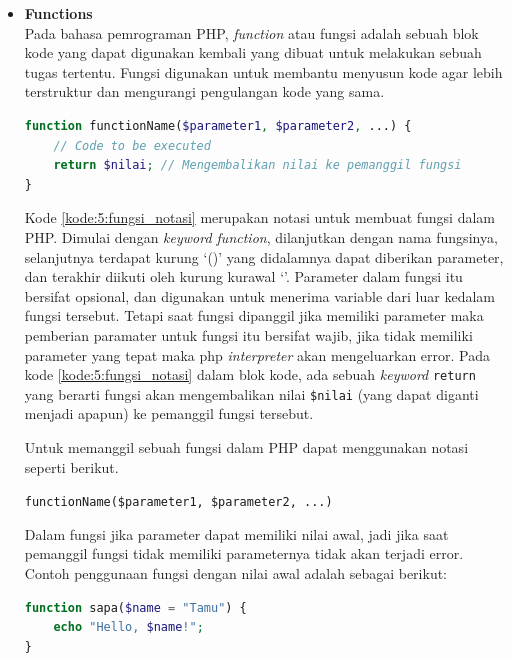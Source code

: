 \documentclass[a4paper,twoside]{article}
\begin{document}
\begin{enumerate}
\begin{itemize}
\begin{itemize}
		            \end{itemize}

		      \item \textbf{Functions} \\
		            Pada bahasa pemrograman PHP, \textit{function} atau fungsi adalah sebuah blok kode yang dapat digunakan kembali yang dibuat untuk melakukan sebuah tugas tertentu. Fungsi digunakan untuk membantu menyusun kode agar lebih terstruktur dan mengurangi pengulangan kode yang sama.

		            \begin{lstlisting}[language={php}, caption={Notasi fungsi}, label={kode:5:fungsi_notasi}]
function functionName($parameter1, $parameter2, ...) {
    // Code to be executed
	return $nilai; // Mengembalikan nilai ke pemanggil fungsi
}
			  \end{lstlisting}

		            Kode \ref{kode:5:fungsi_notasi} merupakan notasi untuk membuat fungsi dalam PHP. Dimulai dengan \textit{keyword function}, dilanjutkan dengan nama fungsinya, selanjutnya terdapat kurung `()' yang didalamnya dapat diberikan parameter, dan terakhir diikuti oleh kurung kurawal `{}'. Parameter dalam fungsi itu bersifat opsional, dan digunakan untuk menerima variable dari luar kedalam fungsi tersebut. Tetapi saat fungsi dipanggil jika memiliki parameter maka pemberian paramater untuk fungsi itu bersifat wajib, jika tidak memiliki parameter yang tepat maka php \textit{interpreter} akan mengeluarkan error. Pada kode \ref{kode:5:fungsi_notasi} dalam blok kode, ada sebuah \textit{keyword} \verb|return| yang berarti fungsi akan mengembalikan nilai \verb|$nilai| (yang dapat diganti menjadi apapun) ke pemanggil fungsi tersebut.

		            Untuk memanggil sebuah fungsi dalam PHP dapat menggunakan notasi seperti berikut.

		            \begin{center}
			            \verb|functionName($parameter1, $parameter2, ...)|
		            \end{center}

		            Dalam fungsi jika parameter dapat memiliki nilai awal, jadi jika saat pemanggil fungsi tidak memiliki parameternya tidak akan terjadi error. Contoh penggunaan fungsi dengan nilai awal adalah sebagai berikut:

		            \begin{lstlisting}[language={php}, caption={Contoh Penggunaan fungsi}, label={kode:5:fungsi_ex}]
function sapa($name = "Tamu") {
    echo "Hello, $name!";
}


\end{lstlisting}
\end{itemize}
\end{enumerate}
\end{document}
